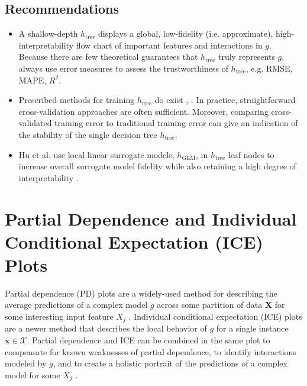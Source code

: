 \documentclass[sigconf]{acmart}
\begin{document}
\vspace{-15pt}

\subsection{Recommendations}

\begin{itemize}
	
	\item A shallow-depth $h_{\text{tree}}$ displays a global, low-fidelity (i.e. approximate), high-interpretability flow chart of important features and interactions in $g$. Because there are few theoretical guarantees that $h_{\text{tree}}$ truly represents $g$, always use error measures to assess the trustworthiness of $h_{\text{tree}}$, e.g. RMSE, MAPE, $R^2$.
	
	\item Prescribed methods for training $h_{\text{tree}}$ do exist \cite{dt_surrogate2}, \cite{dt_surrogate1}. In practice, straightforward cross-validation approaches are often sufficient. Moreover, comparing cross-validated training error to traditional training error can give an indication of the stability of the single decision tree $h_{\text{tree}}$.
	
	\item Hu et al. use local linear surrogate models, $h_{\text{GLM}}$, in $h_{\text{tree}}$ leaf nodes to increase overall surrogate model fidelity while also retaining a high degree of interpretability \cite{lime-sup}.
	
\end{itemize}

\section{Partial Dependence and Individual Conditional Expectation (ICE) Plots}
\label{sec:pd_ice}

Partial dependence (PD) plots are a widely-used method for describing the average predictions of a complex model $g$ across some partition of data $\mathbf{X}$ for some interesting input feature $X_j$ \cite{esl}. Individual conditional expectation (ICE) plots are a newer method that describes the local behavior of $g$ for a single instance $\mathbf{x} \in \mathcal{X}$. Partial dependence and ICE can be combined in the same plot to compensate for known weaknesses of partial dependence, to identify interactions modeled by $g$, and to create a holistic portrait of the predictions of a complex model for some $X_j$  \cite{ice_plots}.
\end{document}
